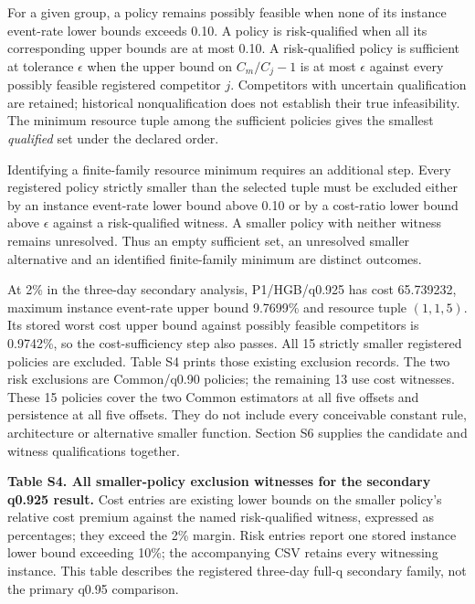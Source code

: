 \documentclass[
  british,
  11pt,
]{article}
\newcounter{none} %
\begin{document}
For a given group, a policy remains possibly feasible when none of its
instance event-rate lower bounds exceeds 0.10. A policy is
risk-qualified when all its corresponding upper bounds are at most 0.10.
A risk-qualified policy is sufficient at tolerance \(\epsilon\) when the
upper bound on \(C_m/C_j-1\) is at most \(\epsilon\) against every
possibly feasible registered competitor \(j\). Competitors with
uncertain qualification are retained; historical nonqualification does
not establish their true infeasibility. The minimum resource tuple among
the sufficient policies gives the smallest \emph{qualified} set under
the declared order.

Identifying a finite-family resource minimum requires an additional
step. Every registered policy strictly smaller than the selected tuple
must be excluded either by an instance event-rate lower bound above 0.10
or by a cost-ratio lower bound above \(\epsilon\) against a
risk-qualified witness. A smaller policy with neither witness remains
unresolved. Thus an empty sufficient set, an unresolved smaller
alternative and an identified finite-family minimum are distinct
outcomes.

At 2\% in the three-day secondary analysis, P1/HGB/q0.925 has cost
65.739232, maximum instance event-rate upper bound 9.7699\% and resource
tuple \((1,1,5)\). Its stored worst cost upper bound against possibly
feasible competitors is 0.9742\%, so the cost-sufficiency step also
passes. All 15 strictly smaller registered policies are excluded. Table
S4 prints those existing exclusion records. The two risk exclusions are
Common/q0.90 policies; the remaining 13 use cost witnesses. These 15
policies cover the two Common estimators at all five offsets and
persistence at all five offsets. They do not include every conceivable
constant rule, architecture or alternative smaller function. Section S6
supplies the candidate and witness qualifications together.


\textbf{Table S4. All smaller-policy exclusion witnesses for the
secondary q0.925 result.} Cost entries are existing lower bounds on the
smaller policy's relative cost premium against the named risk-qualified
witness, expressed as percentages; they exceed the 2\% margin. Risk
entries report one stored instance lower bound exceeding 10\%; the
accompanying CSV retains every witnessing instance. This table describes
the registered three-day full-q secondary family, not the primary q0.95
comparison.
\end{document}
